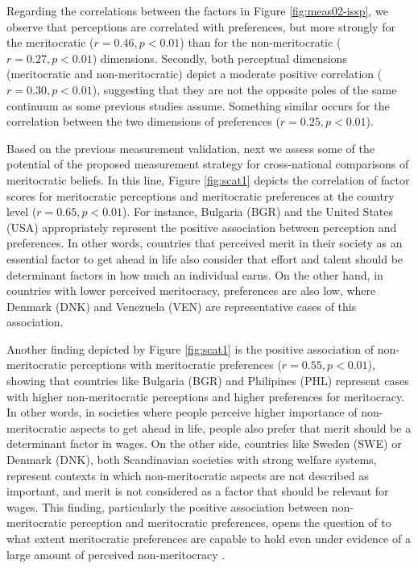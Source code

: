 \documentclass[
  10pt,
  a4paper,
]{article}
\begin{document}
Regarding the correlations between the factors in Figure \ref{fig:meas02-issp}, we observe that perceptions are correlated with preferences, but more strongly for the meritocratic (\(r=0.46, p<0.01\)) than for the non-meritocratic (\(r=0.27,p<0.01\)) dimensions. Secondly, both perceptual dimensions (meritocratic and non-meritocratic) depict a moderate positive correlation (\(r=0.30, p<0.01\)), suggesting that they are not the opposite poles of the same continuum as some previous studies assume. Something similar occurs for the correlation between the two dimensions of preferences (\(r=0.25,p<0.01\)).

Based on the previous measurement validation, next we assess some of the potential of the proposed measurement strategy for cross-national comparisons of meritocratic beliefs. In this line, Figure \ref{fig:scat1} depicts the correlation of factor scores for meritocratic perceptions and meritocratic preferences at the country level (\(r=0.65,p<0.01\)). For instance, Bulgaria (BGR) and the United States (USA) appropriately represent the positive association between perception and preferences. In other words, countries that perceived merit in their society as an essential factor to get ahead in life also consider that effort and talent should be determinant factors in how much an individual earns. On the other hand, in countries with lower perceived meritocracy, preferences are also low, where Denmark (DNK) and Venezuela (VEN) are representative cases of this association.

Another finding depicted by Figure \ref{fig:scat1} is the positive association of non-meritocratic perceptions with meritocratic preferences (\(r=0.55,p<0.01\)), showing that countries like Bulgaria (BGR) and Philipines (PHL) represent cases with higher non-meritocratic perceptions and higher preferences for meritocracy. In other words, in societies where people perceive higher importance of non-meritocratic aspects to get ahead in life, people also prefer that merit should be a determinant factor in wages. On the other side, countries like Sweden (SWE) or Denmark (DNK), both Scandinavian societies with strong welfare systems, represent contexts in which non-meritocratic aspects are not described as important, and merit is not considered as a factor that should be relevant for wages. This finding, particularly the positive association between non-meritocratic perception and meritocratic preferences, opens the question of to what extent meritocratic preferences are capable to hold even under evidence of a large amount of perceived non-meritocracy .
\end{document}
